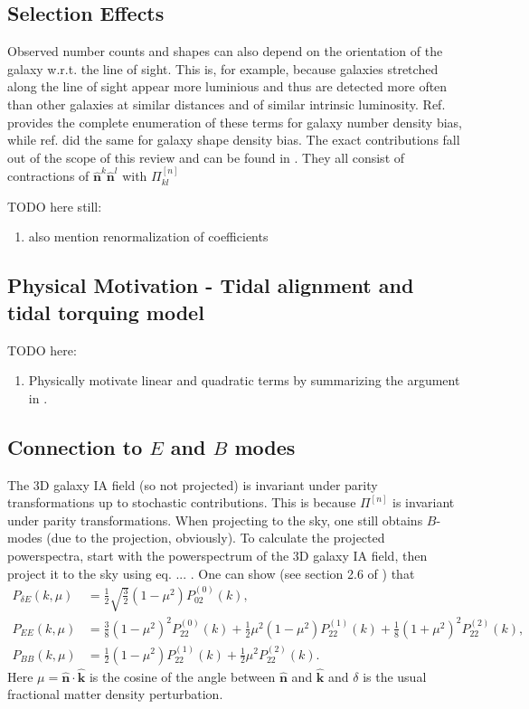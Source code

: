 \documentclass[11pt]{book}
\begin{document}
\subsection{Selection Effects}
Observed number counts and shapes can also depend on the orientation of the galaxy w.r.t. the line of sight. This is, for example, because galaxies stretched along the line of sight appear more luminious and thus are detected more often than other galaxies at similar distances and of similar intrinsic luminosity. Ref. \cite{Desjacques_2018_2} %
provides the complete enumeration of these terms for galaxy number density bias, while ref. \cite{Vlah_2020} did the same for galaxy shape density bias. The exact contributions fall out of the scope of this review and can be found in \cite{Vlah_2020}. They all consist of contractions of $\hat {\mathbf n}^k\hat {\mathbf n}^l$ with $\Pi^{[n]}_{kl}$

TODO here still:
\begin{enumerate}
    \item also mention renormalization of coefficients
\end{enumerate}

\subsection{Physical Motivation - Tidal alignment and tidal torquing model}
TODO here:
\begin{enumerate}
    \item Physically motivate linear and quadratic terms by summarizing the argument in \cite{Chisari_2013}.
\end{enumerate}

\subsection{Connection to $E$ and $B$ modes}
The 3D galaxy IA field (so not projected) is invariant under parity transformations up to stochastic contributions. This is because $\Pi^{[n]}$ is invariant under parity transformations. When projecting to the sky, one still obtains $B$-modes (due to the projection, obviously). 
To calculate the projected powerspectra, start with the powerspectrum of the 3D galaxy IA field, %
then project it to the sky using eq. ... . One can show (see section 2.6 of \cite{bakx2023effectivefieldtheoryintrinsic}) that
\begin{align}
    P_{\delta E}(k,\mu) &= \frac{1}{2}\sqrt{\frac{3}{2}}(1-\mu^2)P_{02}^{(0)}(k), \\
    P_{EE}(k, \mu) &= \frac{3}{8}(1-\mu^2)^2P_{22}^{(0)}(k) + \frac{1}{2}\mu^2(1-\mu^2)P_{22}^{(1)}(k)+\frac{1}{8}(1+\mu^2)^2P_{22}^{(2)}(k), \\
    P_{BB}(k, \mu) &= \frac{1}{2}(1-\mu^2)P_{22}^{(1)}(k)+\frac{1}{2}\mu^2P_{22}^{(2)}(k).
\end{align}
Here $\mu = \hat{\mathbf n} \cdot \hat{\mathbf k}$ is the cosine of the angle between $\hat{\mathbf n}$ and $\hat{\mathbf k}$ and $\delta$ is the usual fractional matter density perturbation.
\end{document}
